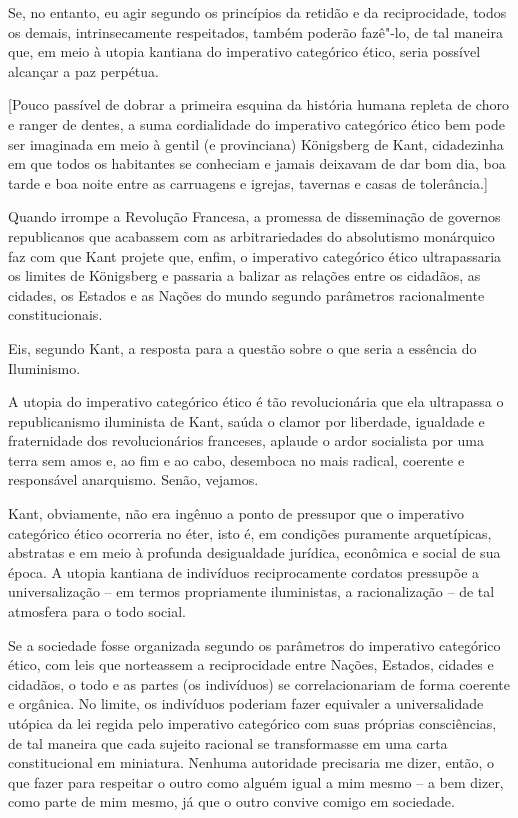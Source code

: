 Se, no entanto, eu agir segundo os princípios da retidão e da
reciprocidade, todos os demais, intrinsecamente respeitados, também
poderão fazê"-lo, de tal maneira que, em meio à utopia kantiana do
imperativo categórico ético, seria possível alcançar a paz perpétua.

{[}Pouco passível de dobrar a primeira esquina da história humana
repleta de choro e ranger de dentes, a suma cordialidade do imperativo
categórico ético bem pode ser imaginada em meio à gentil (e provinciana)
Königsberg de Kant, cidadezinha em que todos os habitantes se conheciam
e jamais deixavam de dar bom dia, boa tarde e boa noite entre as
carruagens e igrejas, tavernas e casas de tolerância.{]}

Quando irrompe a Revolução Francesa, a promessa de disseminação de
governos republicanos que acabassem com as arbitrariedades do
absolutismo monárquico faz com que Kant projete que, enfim, o imperativo
categórico ético ultrapassaria os limites de Königsberg e passaria a
balizar as relações entre os cidadãos, as cidades, os Estados e as
Nações do mundo segundo parâmetros racionalmente constitucionais.

Eis, segundo Kant, a resposta para a questão sobre o que seria a
essência do Iluminismo.

A utopia do imperativo categórico ético é tão revolucionária que ela
ultrapassa o republicanismo iluminista de Kant, saúda o clamor por
liberdade, igualdade e fraternidade dos revolucionários franceses,
aplaude o ardor socialista por uma terra sem amos e, ao fim e ao cabo,
desemboca no mais radical, coerente e responsável anarquismo. Senão,
vejamos.

Kant, obviamente, não era ingênuo a ponto de pressupor que o imperativo
categórico ético ocorreria no éter, isto é, em condições puramente
arquetípicas, abstratas e em meio à profunda desigualdade jurídica,
econômica e social de sua época. A utopia kantiana de indivíduos
reciprocamente cordatos pressupõe a universalização -- em termos
propriamente iluministas, a racionalização -- de tal atmosfera para o
todo social.

Se a sociedade fosse organizada segundo os parâmetros do imperativo
categórico ético, com leis que norteassem a reciprocidade entre Nações,
Estados, cidades e cidadãos, o todo e as partes (os indivíduos) se
correlacionariam de forma coerente e orgânica. No limite, os indivíduos
poderiam fazer equivaler a universalidade utópica da lei regida pelo
imperativo categórico com suas próprias consciências, de tal maneira que
cada sujeito racional se transformasse em uma carta constitucional em
miniatura. Nenhuma autoridade precisaria me dizer, então, o que fazer
para respeitar o outro como alguém igual a mim mesmo -- a bem dizer,
como parte de mim mesmo, já que o outro convive comigo em sociedade.

